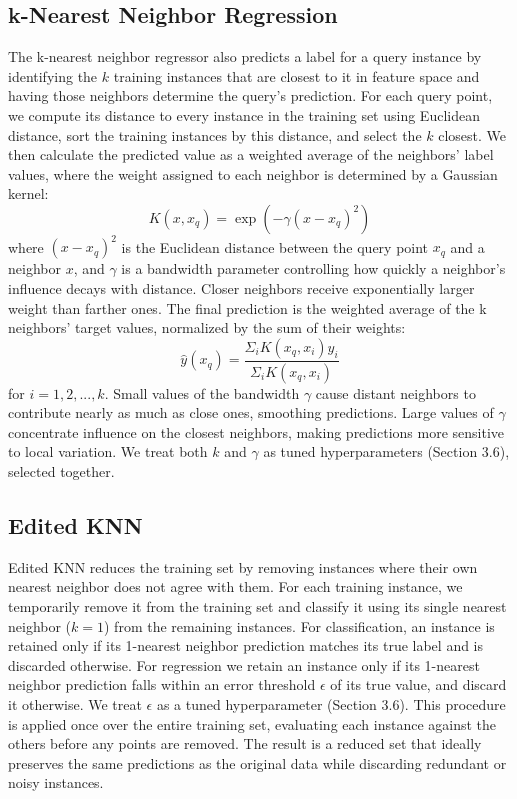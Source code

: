 \documentclass[twoside,11pt]{article}
\begin{document}
\subsection{k-Nearest Neighbor Regression}
The k-nearest neighbor regressor also predicts a label for a query instance by identifying the $k$ training instances that are closest to it in feature space and having those neighbors determine the query's prediction. For each query point, we compute its distance to every instance in the training set using Euclidean distance, sort the training instances by this distance, and select the $k$ closest. We then calculate the predicted value as a weighted average of the neighbors' label values, where the weight assigned to each neighbor is determined by a Gaussian kernel:
\begin{equation}
    K(x,x_q) = \exp(-\gamma(x-x_q)^2)
\end{equation}
where $(x-x_q)^2$ is the Euclidean distance between the query point $x_q$ and a neighbor $x$, and $\gamma$ is a bandwidth parameter controlling how quickly a neighbor's influence decays with distance. Closer neighbors receive exponentially larger weight than farther ones. The final prediction is the weighted average of the k neighbors' target values, normalized by the sum of their weights:
\begin{equation}
    \hat{y}(x_q) = \frac{\Sigma_iK(x_q,x_i)y_i}{\Sigma_iK(x_q,x_i)}
\end{equation}
for $i=1,2,...,k$. Small values of the bandwidth $\gamma$ cause distant neighbors to contribute nearly as much as close ones, smoothing predictions. Large values of $\gamma$ concentrate influence on the closest neighbors, making predictions more sensitive to local variation. We treat both $k$ and $\gamma$ as tuned hyperparameters (Section 3.6), selected together.

\subsection{Edited KNN}
Edited KNN reduces the training set by removing instances where their own nearest neighbor does not agree with them. For each training instance, we temporarily remove it from the training set and classify it using its single nearest neighbor ($k = 1$) from the remaining instances. For classification, an instance is retained only if its 1-nearest neighbor prediction matches its true label and is discarded otherwise. For regression we retain an instance only if its 1-nearest neighbor prediction falls within an error threshold $\epsilon$ of its true value, and discard it otherwise. We treat $\epsilon$ as a tuned hyperparameter (Section 3.6). This procedure is applied once over the entire training set, evaluating each instance against the others before any points are removed. The result is a reduced set that ideally preserves the same predictions as the original data while discarding redundant or noisy instances.
\end{document}
